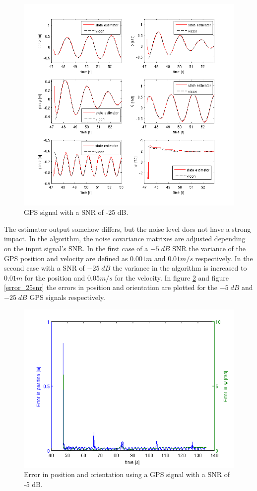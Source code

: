 \begin{figure}[h]
\centering
\includegraphics[width=1\textwidth]{pictures/2_2_SNR25_detail_GPS.png}
\caption{GPS signal with a SNR of -25 dB.}
\label{detail_25snr}
\end{figure}
The estimator output somehow differs, but the noise level does not have a strong impact. In the algorithm, the noise covariance matrixes are adjusted depending on the input signal's SNR. In the first case of a $-5\; dB$ SNR the variance of the GPS position and velocity are defined as $0.001 m$ and $0.01 m/s$ respectively. In the second case with a SNR of $-25\; dB$ the variance in the algorithm is increased to $0.01 m$ for the position and $0.05 m/s$ for the velocity.
In figure \ref{error_5snr} and figure \ref{error_25snr} the errors in position and orientation are plotted for the $-5\; dB$ and $-25\; dB$ GPS signals respectively. 
\begin{figure}[h]
\centering
\includegraphics[width=1\textwidth]{pictures/2_2_SNR5_errors_GPS.png}
\caption{Error in position and orientation using a GPS signal with a SNR of -5 dB.}
\label{error_5snr}
\end{figure}
